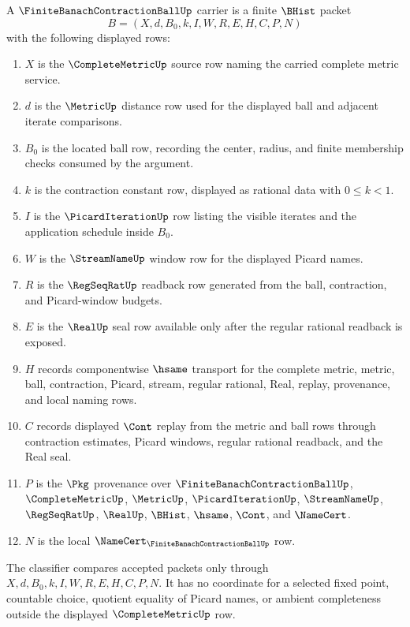 \begin{definition}
\label{def:finite-banach-contraction-ball-carrier}
A $\FiniteBanachContractionBallUp$ carrier is a finite $\BHist$ packet
$$
B=(X,d,B_0,k,I,W,R,E,H,C,P,N)
$$
with the following displayed rows:
\begin{enumerate}
\item $X$ is the $\CompleteMetricUp$ source row naming the carried complete metric service.
\item $d$ is the $\MetricUp$ distance row used for the displayed ball and adjacent iterate comparisons.
\item $B_0$ is the located ball row, recording the center, radius, and finite membership checks consumed by the argument.
\item $k$ is the contraction constant row, displayed as rational data with $0\le k<1$.
\item $I$ is the $\PicardIterationUp$ row listing the visible iterates and the application schedule inside $B_0$.
\item $W$ is the $\StreamNameUp$ window row for the displayed Picard names.
\item $R$ is the $\RegSeqRatUp$ readback row generated from the ball, contraction, and Picard-window budgets.
\item $E$ is the $\RealUp$ seal row available only after the regular rational readback is exposed.
\item $H$ records componentwise $\hsame$ transport for the complete metric, metric, ball, contraction, Picard, stream, regular rational, Real, replay, provenance, and local naming rows.
\item $C$ records displayed $\Cont$ replay from the metric and ball rows through contraction estimates, Picard windows, regular rational readback, and the Real seal.
\item $P$ is the $\Pkg$ provenance over $\FiniteBanachContractionBallUp$, $\CompleteMetricUp$, $\MetricUp$, $\PicardIterationUp$, $\StreamNameUp$, $\RegSeqRatUp$, $\RealUp$, $\BHist$, $\hsame$, $\Cont$, and $\NameCert$.
\item $N$ is the local $\NameCert_{\FiniteBanachContractionBallUp}$ row.
\end{enumerate}
The classifier compares accepted packets only through $X,d,B_0,k,I,W,R,E,H,C,P,N$. It has no coordinate for a selected fixed point, countable choice, quotient equality of Picard names, or ambient completeness outside the displayed $\CompleteMetricUp$ row.
\end{definition}

